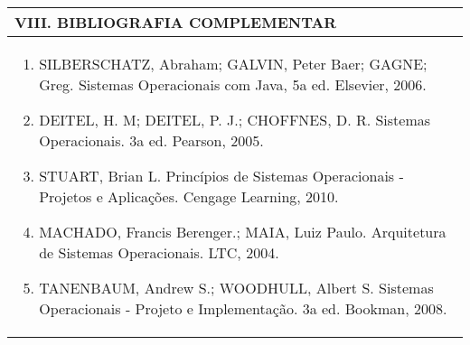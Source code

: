 \documentclass[12pt]{article}
\begin{document}

\begin{longtable}{|L{1.025\textwidth}|} \hline
%
{\bf VIII. BIBLIOGRAFIA COMPLEMENTAR} \\ \hline
\begin{enumerate}
\item SILBERSCHATZ, Abraham; GALVIN, Peter Baer; GAGNE; Greg. Sistemas Operacionais com Java, 5a ed. Elsevier, 2006. 
\item DEITEL, H. M; DEITEL, P. J.; CHOFFNES, D. R. Sistemas Operacionais. 3a ed. Pearson, 2005. 
\item STUART, Brian L. Princípios de Sistemas Operacionais - Projetos e Aplicações. Cengage Learning, 2010. 
\item MACHADO, Francis Berenger.; MAIA, Luiz Paulo. Arquitetura de Sistemas Operacionais. LTC, 2004. 
\item  TANENBAUM, Andrew S.; WOODHULL, Albert S. Sistemas Operacionais - Projeto e Implementação. 3a ed. Bookman, 2008.
\end{enumerate}
 \\ \hline
\end{longtable}




\end{document}
